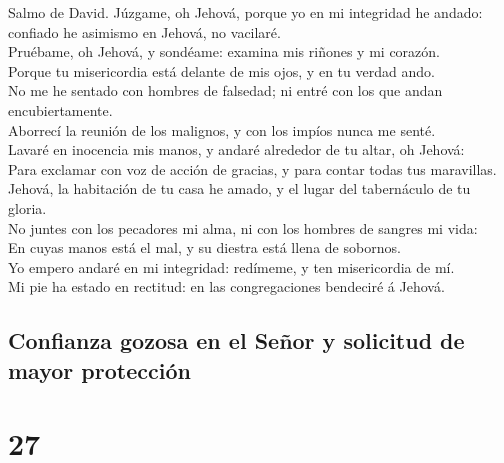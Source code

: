  Salmo de David. Júzgame, oh Jehová, porque yo en mi
integridad he andado: confiado he asimismo en Jehová, no vacilaré.\\
 Pruébame, oh Jehová, y sondéame: examina mis riñones y mi
corazón.\\
 Porque tu misericordia está delante de mis ojos, y en tu
verdad ando.\\
 No me he sentado con hombres de falsedad; ni entré con
los que andan encubiertamente.\\
 Aborrecí la reunión de los malignos, y con los impíos
nunca me senté.\\
 Lavaré en inocencia mis manos, y andaré alrededor de tu
altar, oh Jehová:\\
 Para exclamar con voz de acción de gracias, y para contar
todas tus maravillas.\\
 Jehová, la habitación de tu casa he amado, y el lugar del
tabernáculo de tu gloria.\\
 No juntes con los pecadores mi alma, ni con los hombres
de sangres mi vida:\\
 En cuyas manos está el mal, y su diestra está llena de
sobornos.\\
 Yo empero andaré en mi integridad: redímeme, y ten
misericordia de mí.\\
 Mi pie ha estado en rectitud: en las congregaciones
bendeciré á Jehová.

\hypertarget{confianza-gozosa-en-el-seuxf1or-y-solicitud-de-mayor-protecciuxf3n}{%
\subsection{Confianza gozosa en el Señor y solicitud de mayor
protección}\label{confianza-gozosa-en-el-seuxf1or-y-solicitud-de-mayor-protecciuxf3n}}

\hypertarget{section-26}{%
\section{27}\label{section-26}}

